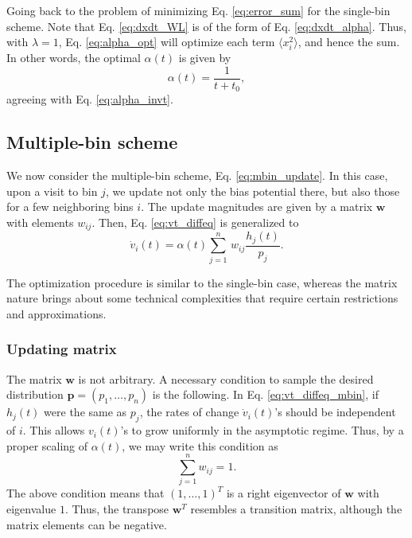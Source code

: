 \documentclass[reprint, floatfix]{revtex4-1}
\begin{document}
Going back to the problem of
minimizing Eq. \eqref{eq:error_sum}
for the single-bin scheme.
%
Note that Eq. \eqref{eq:dxdt_WL}
is of the form of Eq. \eqref{eq:dxdt_alpha}.
%
Thus, with $\lambda = 1$,
Eq. \eqref{eq:alpha_opt}
will optimize each term $\langle x_i^2 \rangle$,
and hence the sum.
%
In other words, the optimal $\alpha(t)$
is given by
\begin{equation}
\alpha(t)
=
\frac{    1     }
     {  t + t_0 }
,
\label{eq:alpha_invt1}
\end{equation}
agreeing with Eq. \eqref{eq:alpha_invt}.



\subsection{\label{sec:multiple-bin}
Multiple-bin scheme}



We now consider the multiple-bin scheme,
Eq. \eqref{eq:mbin_update}.
%
In this case,
upon a visit to bin $j$,
we update not only the bias potential there,
but also those for a few neighboring bins $i$.
%
The update magnitudes are given by a matrix
$\mathbf w$
with elements $w_{ij}$.
%
Then, Eq. \eqref{eq:vt_diffeq} is generalized to
\begin{equation}
  \dot v_i(t)
  =
  \alpha(t) \sum_{j=1}^n \, w_{ij} \frac{ h_j(t) } { p_j }.
  \label{eq:vt_diffeq_mbin}
\end{equation}


The optimization procedure is similar to the single-bin case,
whereas the matrix nature brings about
some technical complexities that require
certain restrictions and approximations.



\subsubsection{\label{sec:updating-matrix}
Updating matrix}



The matrix $\mathbf w$ is not arbitrary.
%
A necessary condition to sample
the desired distribution
$\mathbf p = (p_1, \dots, p_n)$
is the following.
%
In Eq. \eqref{eq:vt_diffeq_mbin},
if $h_j(t)$ were the same as $p_j$,
the rates of change $\dot v_i(t)$'s
should be independent of $i$.
%
This allows $v_i(t)$'s to grow uniformly
in the asymptotic regime.
%
Thus, by a proper scaling of $\alpha(t)$,
we may write this condition as
%
\begin{equation}
  \sum_{j = 1}^n w_{ij} = 1.
  \label{eq:w_sumj}
\end{equation}
%
The above condition means that $(1, \dots, 1)^T$
is a right eigenvector of $\mathbf w$
with eigenvalue $1$.
%
Thus, the transpose $\mathbf w^T$
resembles a transition matrix,
although the matrix elements can be negative.
\end{document}
